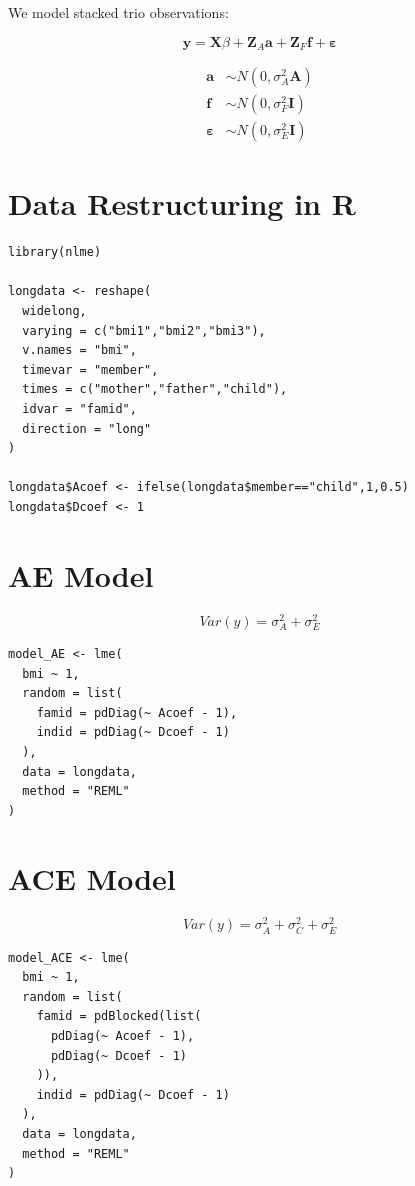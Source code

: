 \documentclass[12pt]{article}
\begin{document}
We model stacked trio observations:

\[
\mathbf{y} = \mathbf{X}\beta + \mathbf{Z}_A \mathbf{a} + 
\mathbf{Z}_F \mathbf{f} + \boldsymbol{\varepsilon}
\]

\begin{align}
\mathbf{a} &\sim N(0, \sigma_A^2 \mathbf{A}) \\
\mathbf{f} &\sim N(0, \sigma_F^2 \mathbf{I}) \\
\boldsymbol{\varepsilon} &\sim N(0, \sigma_E^2 \mathbf{I})
\end{align}

\section{Data Restructuring in R}

\begin{verbatim}
library(nlme)

longdata <- reshape(
  widelong,
  varying = c("bmi1","bmi2","bmi3"),
  v.names = "bmi",
  timevar = "member",
  times = c("mother","father","child"),
  idvar = "famid",
  direction = "long"
)

longdata$Acoef <- ifelse(longdata$member=="child",1,0.5)
longdata$Dcoef <- 1
\end{verbatim}

\section{AE Model}

\[
Var(y) = \sigma_A^2 + \sigma_E^2
\]

\begin{verbatim}
model_AE <- lme(
  bmi ~ 1,
  random = list(
    famid = pdDiag(~ Acoef - 1),
    indid = pdDiag(~ Dcoef - 1)
  ),
  data = longdata,
  method = "REML"
)
\end{verbatim}

\section{ACE Model}

\[
Var(y) = \sigma_A^2 + \sigma_C^2 + \sigma_E^2
\]

\begin{verbatim}
model_ACE <- lme(
  bmi ~ 1,
  random = list(
    famid = pdBlocked(list(
      pdDiag(~ Acoef - 1),
      pdDiag(~ Dcoef - 1)
    )),
    indid = pdDiag(~ Dcoef - 1)
  ),
  data = longdata,
  method = "REML"
)
\end{verbatim}
\end{document}
